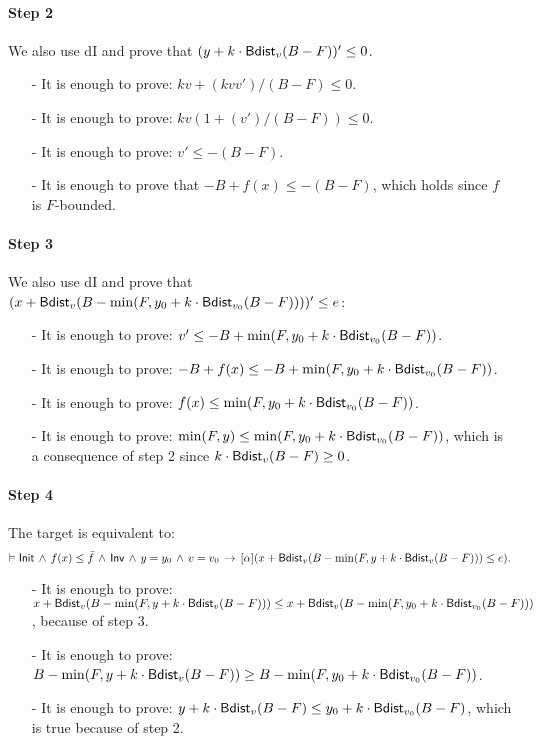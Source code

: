 \paragraph{Step 2} We also use dI and prove that $(y + k \cdot \textsf{Bdist}_{v}(B-F))' \le 0$.
\begin{itemize}
    \item[-] It is enough to prove: $k v + (k v v') / (B - F) \le 0$.
    \item[-] It is enough to prove: $k v (1 + (v')/(B-F)) \le 0$.
    \item[-] It is enough to prove: $v' \le -(B-F)$.
    \item[-] It is enough to prove that $-B + f(x) \le -(B-F)$, which holds since $f$ is $F$-bounded.
\end{itemize}

\paragraph{Step 3} We also use dI and prove that $(x + \textsf{Bdist}_{v}(B - \min(F, y_0 + k \cdot \textsf{Bdist}_{v_0}(B-F))))' \le e$:
\begin{itemize}
    \item[-] It is enough to prove: $v' \le -B + \min(F, y_0 + k \cdot \textsf{Bdist}_{v_0}(B-F))$.
    \item[-] It is enough to prove: $-B + f(x) \le -B + \min(F, y_0 + k \cdot \textsf{Bdist}_{v_0}(B-F))$.
    \item[-] It is enough to prove: $f(x) \le \min(F, y_0 + k \cdot \textsf{Bdist}_{v_0}(B-F))$.
    \item[-] It is enough to prove: $\min(F, y) \le \min(F, y_0 + k \cdot \textsf{Bdist}_{v_0}(B-F))$, which is a consequence of step 2 since $k \cdot \textsf{Bdist}_{v}(B-F) \ge 0$.
\end{itemize}

\paragraph{Step 4} The target is equivalent to: \[\vDash \mathsf{Init} \, \land \, f(x) \le \bar {f} \, \land \, \mathsf{Inv} \, \land \, y = y_0 \, \land \, v = v_0 \,\rightarrow\, [\alpha] (x + \textsf{Bdist}_{v}(B - \min(F, y + k \cdot \textsf{Bdist}_{v}(B-F))) \le e).\]
\begin{itemize}
    \item[-] It is enough to prove: $x + \textsf{Bdist}_{v}(B - \min(F, y + k \cdot \textsf{Bdist}_{v}(B-F))) \le x + \textsf{Bdist}_{v}(B - \min(F, y_0 + k \cdot \textsf{Bdist}_{v_0}(B-F)))$, because of step 3.
    \item[-] It is enough to prove: $B - \min(F, y + k \cdot \textsf{Bdist}_{v}(B-F)) \ge B - \min(F, y_0 + k \cdot \textsf{Bdist}_{v_0}(B-F))$.
    \item[-] It is enough to prove: $y + k \cdot \textsf{Bdist}_{v}(B-F) \le y_0 + k \cdot \textsf{Bdist}_{v_0}(B-F)$, which is true because of step 2.
\end{itemize}


